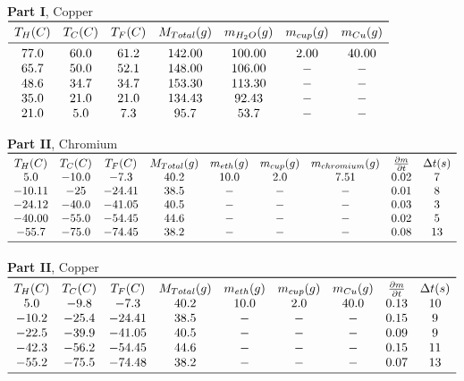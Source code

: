 \documentclass[12pt]{report}
\begin{document}
\begin{center}
\begin{table}[h]
\textbf{Part I}, Copper \\
 $\begin{array}{ *{7}{c} }
\toprule
T_H(C) & T_C(C) & T_F(C) & M_{Total}(g) &  m_{H_2O}(g) & m_{cup}(g) & m_{Cu}(g) \\
\midrule
77.0 & 60.0 & 61.2 & 142.00 & 100.00 & 2.00 & 40.00 \\ 
65.7 & 50.0 & 52.1 &  148.00 & 106.00 & - & - \\ 
48.6 &  34.7 & 34.7 & 153.30 & 113.30 & - & - \\ 
35.0 &  21.0 &  21.0 &  134.43 &  92.43 & - & - \\ 
21.0 & 5.0 &  7.3 &  95.7 & 53.7 & - & - \\ 
 \end{array}$
\end{table}
\begin{table}[h]
\textbf{Part II}, Chromium \\
 $\begin{array}{ *{9}{c} }
\toprule
T_H(C) & T_C(C) & T_F(C) & M_{Total}(g) &  m_{eth}(g) & m_{cup}(g) & m_{chromium}(g)  & \frac{\partial m}{\partial t} & \Delta t(s)\\
5.0 & -10.0 & -7.3 & 40.2 & 10.0 & 2.0 &  7.51 & 0.02 & 7 \\
-10.11 & -25 & -24.41 & 38.5 & - & - & - & 0.01 & 8 \\
-24.12 & -40.0 & -41.05 & 40.5 & - & - & - & 0.03 & 3 \\
-40.00 & -55.0 & -54.45 & 44.6 & - & - & - & 0.02 & 5 \\
-55.7 &  -75.0& -74.45 & 38.2 & - & - & - & 0.08 & 13 \\
\midrule
\end{array}$
\end{table}
\begin{table}[h]
\textbf{Part II}, Copper \\
 $\begin{array}{ *{9}{c} }
\toprule
T_H(C) & T_C(C) & T_F(C) & M_{Total}(g) &  m_{eth}(g) & m_{cup}(g) & m_{Cu}(g)  & \frac{\partial m}{\partial t} & \Delta t(s)\\
5.0 & -9.8 & -7.3 & 40.2 & 10.0 & 2.0 &  40.0 & 0.13 & 10 \\
-10.2 & -25.4 & -24.41 & 38.5 & - & - & - & 0.15 & 9 \\
-22.5 & -39.9 & -41.05 & 40.5 & - & - & - & 0.09 & 9 \\
-42.3 & -56.2 & -54.45 & 44.6 & - & - & - & 0.15 & 11 \\
-55.2 &  -75.5 & -74.48 & 38.2 & - & - & - & 0.07 & 13 \\
\midrule
\end{array}$
\end{table}
\end{center}
\end{document}
